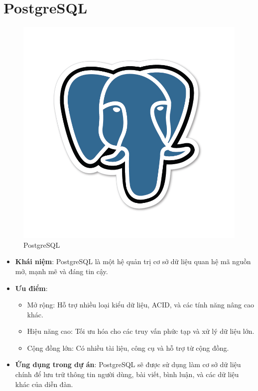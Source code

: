 \documentclass[../index.tex]{subfiles}
\begin{document}
    \section{PostgreSQL}
    \begin{figure}[H]
        \centering
        \includegraphics[width=0.2\linewidth]{figures/tech-logo/postgres.png}
        \caption{PostgreSQL}
    \end{figure}
    \begin{itemize}
        \item \textbf{Khái niệm}: PostgreSQL là một hệ quản trị cơ sở dữ liệu quan
            hệ mã nguồn mở, mạnh mẽ và đáng tin cậy.

        \item \textbf{Ưu điểm}:
            \begin{itemize}
                \item Mở rộng: Hỗ trợ nhiều loại kiểu dữ liệu, ACID, và các tính
                    năng nâng cao khác.

                \item Hiệu năng cao: Tối ưu hóa cho các truy vấn phức tạp và xử
                    lý dữ liệu lớn.

                \item Cộng đồng lớn: Có nhiều tài liệu, công cụ và hỗ trợ từ cộng
                    đồng.
            \end{itemize}

        \item \textbf{Ứng dụng trong dự án}: PostgreSQL sẽ được sử dụng làm cơ sở
            dữ liệu chính để lưu trữ thông tin người dùng, bài viết, bình luận,
            và các dữ liệu khác của diễn đàn.
    \end{itemize}

\end{document}
